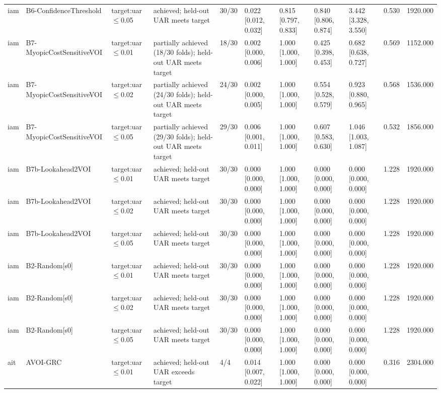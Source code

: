 \begin{table}[!ht]
{\begin{tabular}{lllllllllll}
iam & B6-ConfidenceThreshold & target:uar$\le$0.05 & achieved; held-out UAR meets target & 30/30 & 0.022 [0.012, 0.032] & 0.815 [0.797, 0.833] & 0.840 [0.806, 0.874] & 3.442 [3.328, 3.550] & 0.530 & 1920.000 \\
iam & B7-MyopicCostSensitiveVOI & target:uar$\le$0.01 & partially achieved (18/30 folds); held-out UAR meets target & 18/30 & 0.002 [0.000, 0.006] & 1.000 [1.000, 1.000] & 0.425 [0.398, 0.453] & 0.682 [0.638, 0.727] & 0.569 & 1152.000 \\
iam & B7-MyopicCostSensitiveVOI & target:uar$\le$0.02 & partially achieved (24/30 folds); held-out UAR meets target & 24/30 & 0.002 [0.000, 0.005] & 1.000 [1.000, 1.000] & 0.554 [0.528, 0.579] & 0.923 [0.880, 0.965] & 0.568 & 1536.000 \\
iam & B7-MyopicCostSensitiveVOI & target:uar$\le$0.05 & partially achieved (29/30 folds); held-out UAR meets target & 29/30 & 0.006 [0.001, 0.011] & 1.000 [1.000, 1.000] & 0.607 [0.583, 0.630] & 1.046 [1.003, 1.087] & 0.532 & 1856.000 \\
iam & B7b-Lookahead2VOI & target:uar$\le$0.01 & achieved; held-out UAR meets target & 30/30 & 0.000 [0.000, 0.000] & 1.000 [1.000, 1.000] & 0.000 [0.000, 0.000] & 0.000 [0.000, 0.000] & 1.228 & 1920.000 \\
iam & B7b-Lookahead2VOI & target:uar$\le$0.02 & achieved; held-out UAR meets target & 30/30 & 0.000 [0.000, 0.000] & 1.000 [1.000, 1.000] & 0.000 [0.000, 0.000] & 0.000 [0.000, 0.000] & 1.228 & 1920.000 \\
iam & B7b-Lookahead2VOI & target:uar$\le$0.05 & achieved; held-out UAR meets target & 30/30 & 0.000 [0.000, 0.000] & 1.000 [1.000, 1.000] & 0.000 [0.000, 0.000] & 0.000 [0.000, 0.000] & 1.228 & 1920.000 \\
iam & B2-Random[s0] & target:uar$\le$0.01 & achieved; held-out UAR meets target & 30/30 & 0.000 [0.000, 0.000] & 1.000 [1.000, 1.000] & 0.000 [0.000, 0.000] & 0.000 [0.000, 0.000] & 1.228 & 1920.000 \\
iam & B2-Random[s0] & target:uar$\le$0.02 & achieved; held-out UAR meets target & 30/30 & 0.000 [0.000, 0.000] & 1.000 [1.000, 1.000] & 0.000 [0.000, 0.000] & 0.000 [0.000, 0.000] & 1.228 & 1920.000 \\
iam & B2-Random[s0] & target:uar$\le$0.05 & achieved; held-out UAR meets target & 30/30 & 0.000 [0.000, 0.000] & 1.000 [1.000, 1.000] & 0.000 [0.000, 0.000] & 0.000 [0.000, 0.000] & 1.228 & 1920.000 \\
ait & AVOI-GRC & target:uar$\le$0.01 & achieved; held-out UAR exceeds target & 4/4 & 0.014 [0.007, 0.022] & 1.000 [1.000, 1.000] & 0.000 [0.000, 0.000] & 0.000 [0.000, 0.000] & 0.316 & 2304.000 \\

\end{tabular}}
\end{table}

